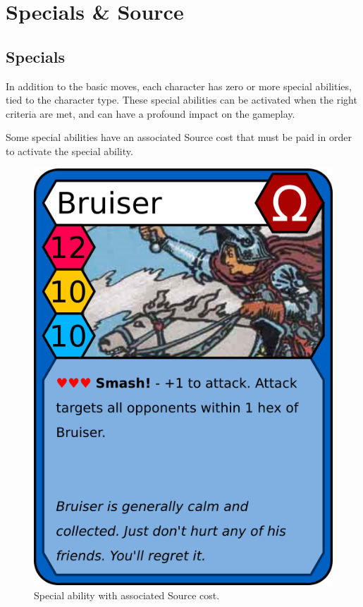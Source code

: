\section{Specials \& Source}\label{energy}
\subsection{Specials}
In addition to the basic moves, each character has zero or more special abilities, tied to the character type. 
These special abilities can be activated when the right criteria are met, and can have a profound impact on the gameplay.

Some special abilities have an associated Source cost that must be paid in order to activate the special ability.

\begin{figure}
    \centering
    \includegraphics{the-game/bruiser-red.png}
    \caption{Special ability with associated Source cost.}
    \label{fig:ability-example}
\end{figure}

